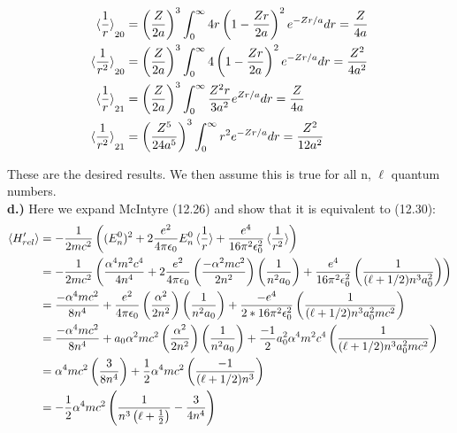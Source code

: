 \documentclass[10pt]{article} %
\begin{document}
\begin{align*}
  \braket{\frac{1}{r}}_{20} &= \left(\frac{Z}{2a}\right)^3\int_0^\infty
  4r\left(1-\frac{Zr}{2a}\right)^2e^{-Zr/a}dr = \frac{Z}{4a}\\
  \braket{\frac{1}{r^2}}_{20} &= \left(\frac{Z}{2a}\right)^3\int_0^\infty
  4\left(1-\frac{Zr}{2a}\right)^2e^{-Zr/a}dr = \frac{Z^2}{4a^2}\\
  \braket{\frac{1}{r}}_{21} &= \left(\frac{Z}{2a}\right)^3\int_0^\infty
  \frac{Z^2r}{3a^2}e^{Zr/a}dr = \frac{Z}{4a}\\
  \braket{\frac{1}{r^2}}_{21} &= \left(\frac{Z^5}{24a^5}\right)^3\int_0^\infty
  r^2e^{-Zr/a}dr = \frac{Z^2}{12a^2}\\
\end{align*}

These are the desired results. We then assume this is true for all n, $\ell$ quantum numbers.\\

\textbf{d.)}
Here we expand McIntyre (12.26) and show that it is equivalent to (12.30):\\

\begin{align*}
  \braket{H'_{rel}} &=
  -\frac{1}{2mc^2}\left((E_n^0)^2 +
  2\frac{e^2}{4\pi\epsilon_0}E_n^0\braket{\frac{1}{r}} +
  \frac{e^4}{16\pi^2\epsilon_0^2}\braket{\frac{1}{r^2}}\right)\\
  &= -\frac{1}{2mc^2}\left(\frac{\alpha^4m^2c^4}{4n^4}
  + 2\frac{e^2}{4\pi\epsilon_0}\left(\frac{-\alpha^2mc^2}{2n^2}\right)
  \left(\frac{1}{n^2a_0}\right) +
  \frac{e^4}{16\pi^2\epsilon_0^2}\left(\frac{1}{(\ell+1/2)n^3a_0^2}\right)\right)\\
  &= \frac{-\alpha^4mc^2}{8n^4}
  + \frac{e^2}{4\pi\epsilon_0}\left(\frac{\alpha^2}{2n^2}\right)
  \left(\frac{1}{n^2a_0}\right) +
  \frac{-e^4}{2*16\pi^2\epsilon_0^2}\left(\frac{1}{(\ell+1/2)n^3a_0^2mc^2}\right)\\
  &= \frac{-\alpha^4mc^2}{8n^4}
  + a_0\alpha^2mc^2\left(\frac{\alpha^2}{2n^2}\right)
  \left(\frac{1}{n^2a_0}\right) +
  \frac{-1}{2}a_0^2\alpha^4m^2c^4\left(\frac{1}{(\ell+1/2)n^3a_0^2mc^2}\right)\\
  &= \alpha^4mc^2\left(\frac{3}{8n^4}\right) +
  \frac{1}{2}\alpha^4mc^2\left(\frac{-1}{(\ell+1/2)n^3}\right)\\
  &= -\frac{1}{2}\alpha^4mc^2\left(\frac{1}{n^3\left(\ell+\frac{1}{2}\right)} -
    \frac{3}{4n^4}\right)\\
\end{align*}
\end{document}

